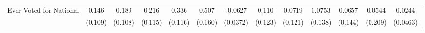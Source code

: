 {\begin{tabular}{l*{12}{c}}
\addlinespace
Ever Voted for National&       0.146         &       0.189         &       0.216         &       0.336\sym{**} &       0.507\sym{**} &     -0.0627         &       0.110         &      0.0719         &      0.0753         &      0.0657         &      0.0544         &      0.0244         \\
            &     (0.109)         &     (0.108)         &     (0.115)         &     (0.116)         &     (0.160)         &    (0.0372)         &     (0.123)         &     (0.121)         &     (0.138)         &     (0.144)         &     (0.209)         &    (0.0463)         \\
\bottomrule
\end{tabular}
}

